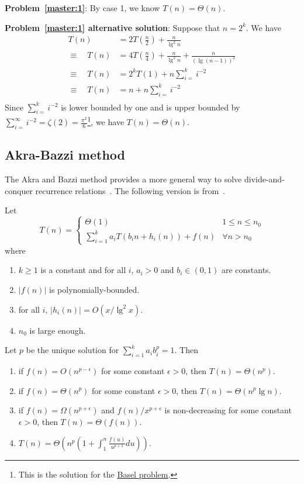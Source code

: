 \begin{refsection}
\begin{Answer}
{\bf Problem~\ref{master:1}}: By case 1, we know $T(n) = \Theta(n)$.

{\bf Problem~\ref{master:1} alternative solution}: Suppose that $n = 2^k$. We have
\begin{align*}
T(n) &= 2T(\frac{n}{2}) + \frac{n}{\lg^2 n} \\
\equiv \quad T(n) &= 4T(\frac{n}{4}) + \frac{n}{\lg^2 n} + \frac{n}{(\lg (n-1))^2} \\
\equiv \quad T(n) &= 2^k T(1) + n \sum_{i=}^k i^{-2} \\
\equiv \quad T(n) &= n + n \sum_{i=}^k i^{-2} \\
\end{align*}
Since $\sum_{i=}^k i^{-2}$ is lower bounded by one and is upper bounded by $\sum_{i=}^{\infty} i^{-2} = \zeta(2) = \frac{\pi^2}{6}$\footnote{This is the solution for the \href{https://en.wikipedia.org/wiki/Basel_problem}{Basel problem}.}, we have $T(n) = \Theta(n)$.
\end{Answer}

\subsection{Akra\--Bazzi method}
The Akra and Bazzi method provides a more general way to solve divide-and-conquer recurrence relations~\cite{Akra1998}. The following version is from~\cite{Leighton1996}.
\begin{theorem}
Let \[T(n) = 
\begin{cases}
\Theta(1)& 1 \leq n \leq n_0 \\
\sum_{i=1}^k a_iT(b_in +h_i(n)) + f(n) &\forall n > n_0
\end{cases}\]
where
\begin{enumerate}
\item $k \geq 1$ is a constant and for all $i$, $a_i > 0$ and $b_i \in (0, 1)$ are constants.
\item $|f(n)|$ is polynomially-bounded.
\item for all $i$, $|h_i(n)| = O(x /\lg^2x)$.
\item $n_0$ is large enough.
\end{enumerate}
Let $p$ be the unique solution for $\sum_{i=1}^k a_ib_i^p = 1$. Then
\begin{enumerate}
\item if $f(n) = O(n^{p-\epsilon})$ for some constant $\epsilon > 0$, then $T(n) = \Theta(n^p)$.
\item if $f(n) = \Theta(n^{p})$ for some constant $\epsilon > 0$, then $T(n) = \Theta(n^p \lg n)$.
\item if $f(n) = \Omega(n^{p+\epsilon})$ and $f(n)/x^{p+\epsilon}$ is non-decreasing for some constant $\epsilon > 0$, then $T(n) = \Theta(f(n))$.
\item $T(n) = \Theta\left(n^p\left(1 + \int_1^n \frac{f(u)}{u^{p+1}}du\right)\right)$.
\end{enumerate}
\end{theorem}


\end{refsection}
